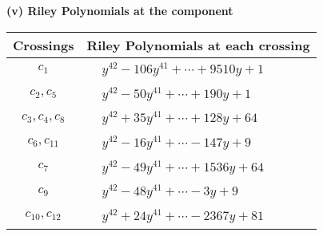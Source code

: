 \documentclass[1p]{elsarticle_modified}
\theoremstyle{definition}
\begin{document}
\newpage\renewcommand{\arraystretch}{1}
\flushleft \textbf{(v) Riley Polynomials at the component}\newline \\
\begin{tabular}{m{50pt}|m{274pt}}
Crossings & \hspace{64pt}Riley Polynomials at each crossing \\
\hline $$\begin{aligned}c_{1}\end{aligned}$$&$\begin{aligned}
&y^{42}-106 y^{41}+\cdots+9510 y+1
\end{aligned}$\\
\hline $$\begin{aligned}c_{2},c_{5}\end{aligned}$$&$\begin{aligned}
&y^{42}-50 y^{41}+\cdots+190 y+1
\end{aligned}$\\
\hline $$\begin{aligned}c_{3},c_{4},c_{8}\end{aligned}$$&$\begin{aligned}
&y^{42}+35 y^{41}+\cdots+128 y+64
\end{aligned}$\\
\hline $$\begin{aligned}c_{6},c_{11}\end{aligned}$$&$\begin{aligned}
&y^{42}-16 y^{41}+\cdots-147 y+9
\end{aligned}$\\
\hline $$\begin{aligned}c_{7}\end{aligned}$$&$\begin{aligned}
&y^{42}-49 y^{41}+\cdots+1536 y+64
\end{aligned}$\\
\hline $$\begin{aligned}c_{9}\end{aligned}$$&$\begin{aligned}
&y^{42}-48 y^{41}+\cdots-3 y+9
\end{aligned}$\\
\hline $$\begin{aligned}c_{10},c_{12}\end{aligned}$$&$\begin{aligned}
&y^{42}+24 y^{41}+\cdots-2367 y+81
\end{aligned}$\\
\hline
\end{tabular}\\~\\
\end{document}
